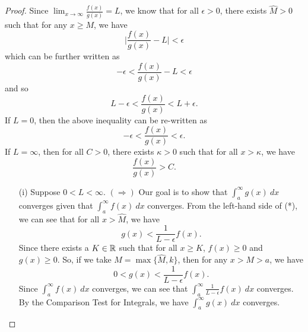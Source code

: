 \documentclass[a4paper]{article}
\begin{document}
\begin{proof}
    Since \( \lim_{ x \to \infty  } \frac{ f(x) }{ g(x) } = L  \), we know that for all \( \epsilon > 0  \), there exists \( \hat{M} > 0  \) such that for any \( x \geq  M  \), we have
    \[  \Big| \frac{ f(x) }{ g(x) }  - L  \Big|  < \epsilon \]
    which can be further written as 
    \[  - \epsilon < \frac{ f(x) }{ g(x) }  - L < \epsilon \]
    and so 
    \[  L - \epsilon  < \frac{ f(x) }{ g(x) }  < L + \epsilon. \tag{*} \]
    If \( L  = 0  \), then the above inequality can be re-written as 
    \[  - \epsilon < \frac{ f(x) }{  g(x) } < \epsilon. \tag{**} \]
    If \( L = \infty   \), then for all \( C > 0  \), there exists \( \kappa > 0  \) such that for all \( x > \kappa  \), we have 
    \[  \frac{ f(x) }{ g(x) }  > C. \tag{***}  \]
    \begin{enumerate}
        \item[(i)] Suppose \(  0  < L < \infty  \). \( (\Longrightarrow) \) Our goal is to show that \( \int_{ a }^{ \infty  } g(x) \ dx   \) converges given that \( \int_{ a }^{ \infty  } f(x) \ dx  \) converges. From the left-hand side of (*), we can see that for all \( x > \hat{M} \), we have 
           \[  g(x) < \frac{ 1  }{ L - \epsilon } f(x). \] 
           Since there exists a \(  K \in \mathbb{R}  \) such that for all \( x \geq K  \), \( f(x) \geq 0  \) and \( g(x) \geq 0  \). So, if we take \( M  = \max \{ \hat{M}, k  \}  \), then for any \( x > M > a   \), we have 
           \[  0 < g(x) < \frac{ 1 }{ L  - \epsilon  } f(x). \]
           Since \( \int_{ a }^{ \infty  } f(x) \ dx  \) converges, we can see that \( \int_{ a }^{ \infty  } \frac{ 1 }{ L - \epsilon  }  f(x) \ dx  \) converges. By the Comparison Test for Integrals, we have \( \int_{ a }^{ \infty  } g(x) \ dx  \) converges.


\end{enumerate}
\end{proof}
\end{document}
